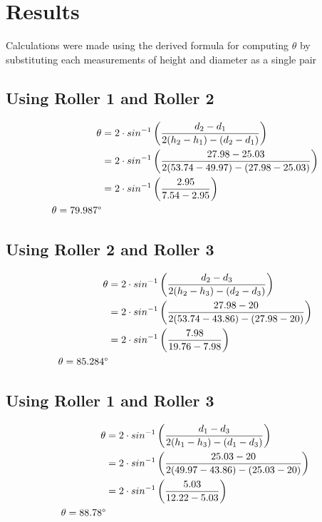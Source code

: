 \documentclass[12pt]{article}
\begin{document}
\section{Results}
Calculations were made using the derived formula for computing $\theta$ by substituting each measurements of height and diameter as a single pair
\subsection{Using Roller 1 and Roller 2}

\begin{align}
	\theta & = 2\cdot sin^{-1}\left(\frac{d_2-d_1}{2(h_2-h_1)-(d_2-d_1)} \right)            \\
	       & =2\cdot sin^{-1}\left(\frac{27.98-25.03}{2(53.74-49.97)-(27.98-25.03)} \right) \\
	       & =2\cdot sin^{-1}\left(\frac{2.95}{7.54-2.95} \right)                           \\
	\theta= 79.987 \degree
\end{align}

\subsection{Using Roller 2 and Roller 3}

\begin{align}
	\theta & = 2\cdot sin^{-1}\left(\frac{d_2-d_3}{2(h_2-h_3)-(d_2-d_3)} \right)      \\
	       & =2\cdot sin^{-1}\left(\frac{27.98-20}{2(53.74-43.86)-(27.98-20)} \right) \\
	       & =2\cdot sin^{-1}\left(\frac{7.98}{19.76-7.98} \right)                    \\
	\theta= 85.284 \degree
\end{align}

\subsection{Using Roller 1 and Roller 3}

\begin{align}
	\theta & = 2\cdot sin^{-1}\left(\frac{d_1-d_3}{2(h_1-h_3)-(d_1-d_3)} \right)      \\
	       & =2\cdot sin^{-1}\left(\frac{25.03-20}{2(49.97-43.86)-(25.03-20)} \right) \\
	       & =2\cdot sin^{-1}\left(\frac{5.03}{12.22-5.03} \right)                    \\
	\theta= 88.78 \degree
\end{align}
\end{document}
